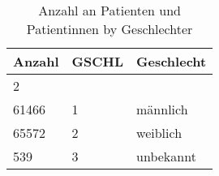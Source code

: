 
\begin{center}
 \begin{longtable}{|p{2.3cm}|p{2cm}|p{2.5cm}|} 
  \caption{Anzahl an Patienten und Patientinnen by Geschlechter} \\
  \hline
\rowcolor{lightgray} Anzahl & GSCHL & Geschlecht \\ \hline
\endhead
2 &   &  \\ \hline
61466 & 1 & männlich \\ \hline
65572 & 2 & weiblich \\ \hline
539 & 3 & unbekannt \\ \hline
\end{longtable}
\end{center}
